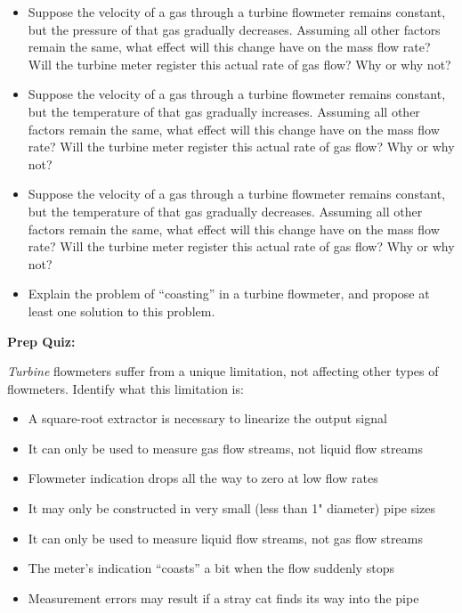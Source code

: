 \begin{itemize}
\item{} Suppose the velocity of a gas through a turbine flowmeter remains constant, but the pressure of that gas gradually decreases.  Assuming all other factors remain the same, what effect will this change have on the mass flow rate?  Will the turbine meter register this actual rate of gas flow?  Why or why not?
\item{} Suppose the velocity of a gas through a turbine flowmeter remains constant, but the temperature of that gas gradually increases.  Assuming all other factors remain the same, what effect will this change have on the mass flow rate?  Will the turbine meter register this actual rate of gas flow?  Why or why not?
\item{} Suppose the velocity of a gas through a turbine flowmeter remains constant, but the temperature of that gas gradually decreases.  Assuming all other factors remain the same, what effect will this change have on the mass flow rate?  Will the turbine meter register this actual rate of gas flow?  Why or why not?
\item{} Explain the problem of ``coasting'' in a turbine flowmeter, and propose at least one solution to this problem.
\end{itemize}










\vfil \eject

\noindent
{\bf Prep Quiz:}

{\it Turbine} flowmeters suffer from a unique limitation, not affecting other types of flowmeters.  Identify what this limitation is:

\begin{itemize}
\item{} A square-root extractor is necessary to linearize the output signal
\vskip 5pt 
\item{} It can only be used to measure gas flow streams, not liquid flow streams 
\vskip 5pt 
\item{} Flowmeter indication drops all the way to zero at low flow rates
\vskip 5pt 
\item{} It may only be constructed in very small (less than 1" diameter) pipe sizes
\vskip 5pt 
\item{} It can only be used to measure liquid flow streams, not gas flow streams
\vskip 5pt 
\item{} The meter's indication ``coasts'' a bit when the flow suddenly stops
\vskip 5pt 
\item{} Measurement errors may result if a stray cat finds its way into the pipe
\end{itemize}




